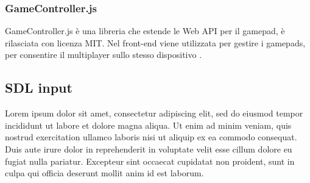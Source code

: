 \subsubsection{GameController.js}
GameController.js è una libreria che estende le Web API per il gamepad, è rilasciata con licenza MIT. Nel front-end viene utilizzata per gestire i gamepads, per consentire il multiplayer sullo stesso dispositivo \parencite{gameController_js}.


\subsection{SDL input}
Lorem ipsum dolor sit amet, consectetur adipiscing elit, sed do eiusmod tempor incididunt ut labore et dolore magna aliqua. Ut enim ad minim veniam, quis nostrud exercitation ullamco laboris nisi ut aliquip ex ea commodo consequat. Duis aute irure dolor in reprehenderit in voluptate velit esse cillum dolore eu fugiat nulla pariatur. Excepteur sint occaecat cupidatat non proident, sunt in culpa qui officia deserunt mollit anim id est laborum.

